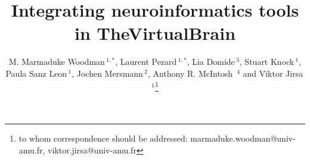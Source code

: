 \copyrightyear{}
\pubyear{}




\title[TVB]{Integrating neuroinformatics tools in TheVirtualBrain}
\author[Woodman {et~al}]{
        M. Marmaduke Woodman\,$^{1,*}$,  
        Laurent Pezard\,$^{1,*}$,  
        Lia Domide\,$^{3}$, 
        Stuart Knock\,$^{1}$, 
        Paula Sanz Leon\,$^{1}$, 
        Jochen Mersmann\,$^{2}$,
        Anthony R. McIntosh \,$^{4}$ and  
        Viktor Jirsa\,$^{1}$\footnote{to whom correspondence should be addressed: marmaduke.woodman@univ-amu.fr,
        viktor.jirsa@univ-amu.fr}}

\address{$^{1}$ Institut de Neurosciences des Syst{\`e}mes, 27, Bd. Jean Moulin, 13005, Marseille, France.\\
         $^{3}$ Codemart, 13, Petofi Sandor, 400610, Cluj-Napoca, Romania.\\
         $^{2}$ CodeBox GmbH, Hugo Eckener Str. 7, 70184 Stuttgart, Germany.\\
         $^{4}$ Rotman Research Institute at Baycrest, Toronto, M6A 2E1, Ontario, Canada\\
        }

\history{}

\editor{}

\maketitle



